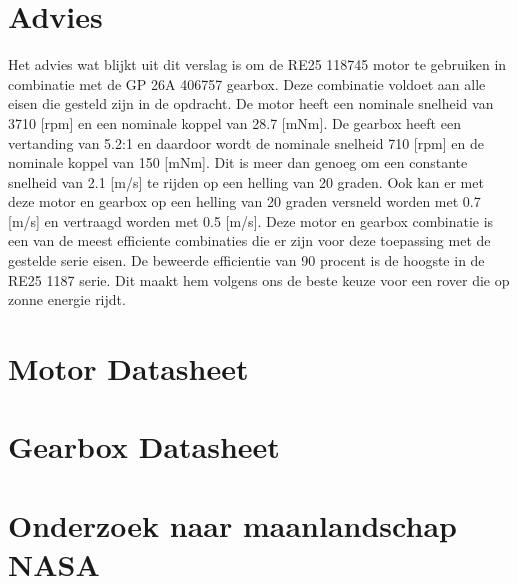 \documentclass{article}
\begin{document}
\section{Advies}
    Het advies wat blijkt uit dit verslag is om de RE25 118745 motor te gebruiken in combinatie met de GP 26A 406757 gearbox. 
    Deze combinatie voldoet aan alle eisen die gesteld zijn in de opdracht.
    De motor heeft een nominale snelheid van 3710 [rpm] en een nominale koppel van 28.7 [mNm].
    De gearbox heeft een vertanding van 5.2:1 en daardoor wordt de nominale snelheid 710 [rpm] en de nominale koppel van 150 [mNm].
    Dit is meer dan genoeg om een constante snelheid van 2.1 [m/s] te rijden op een helling van 20 graden.
    Ook kan er met deze motor en gearbox op een helling van 20 graden versneld worden met 0.7 [m/s] en vertraagd worden met 0.5 [m/s].
    Deze motor en gearbox combinatie is een van de meest efficiente combinaties die er zijn voor deze toepassing met de gestelde serie eisen.
    De beweerde efficientie van 90 procent is de hoogste in de RE25 1187 serie.
    Dit maakt hem volgens ons de beste keuze voor een rover die op zonne energie rijdt.


\clearpage
\appendix
\section{Motor Datasheet}
\label{Bijlage A}

\section{Gearbox Datasheet}
\label{Bijlage B}

\section{Onderzoek naar maanlandschap NASA}
\label{Bijlage C}

\end{document}
